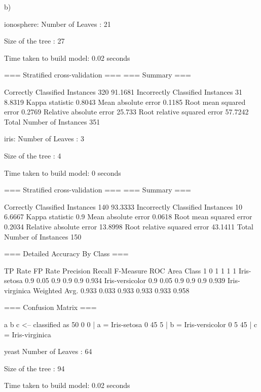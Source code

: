 b)

ionosphere:
Number of Leaves  : 	21

Size of the tree : 	27


Time taken to build model: 0.02 seconds

=== Stratified cross-validation ===
=== Summary ===

Correctly Classified Instances         320               91.1681 %
Incorrectly Classified Instances        31                8.8319 %
Kappa statistic                          0.8043
Mean absolute error                      0.1185
Root mean squared error                  0.2769
Relative absolute error                 25.733  %
Root relative squared error             57.7242 %
Total Number of Instances              351     



iris:
Number of Leaves  : 	3

Size of the tree : 	4


Time taken to build model: 0 seconds

=== Stratified cross-validation ===
=== Summary ===

Correctly Classified Instances         140               93.3333 %
Incorrectly Classified Instances        10                6.6667 %
Kappa statistic                          0.9   
Mean absolute error                      0.0618
Root mean squared error                  0.2034
Relative absolute error                 13.8998 %
Root relative squared error             43.1411 %
Total Number of Instances              150     

=== Detailed Accuracy By Class ===

               TP Rate   FP Rate   Precision   Recall  F-Measure   ROC Area  Class
                 1         0          1         1         1          1        Iris-setosa
                 0.9       0.05       0.9       0.9       0.9        0.934    Iris-versicolor
                 0.9       0.05       0.9       0.9       0.9        0.939    Iris-virginica
Weighted Avg.    0.933     0.033      0.933     0.933     0.933      0.958

=== Confusion Matrix ===

  a  b  c   <-- classified as
 50  0  0 |  a = Iris-setosa
  0 45  5 |  b = Iris-versicolor
  0  5 45 |  c = Iris-virginica

yeast
Number of Leaves  : 	64

Size of the tree : 	94


Time taken to build model: 0.02 seconds


